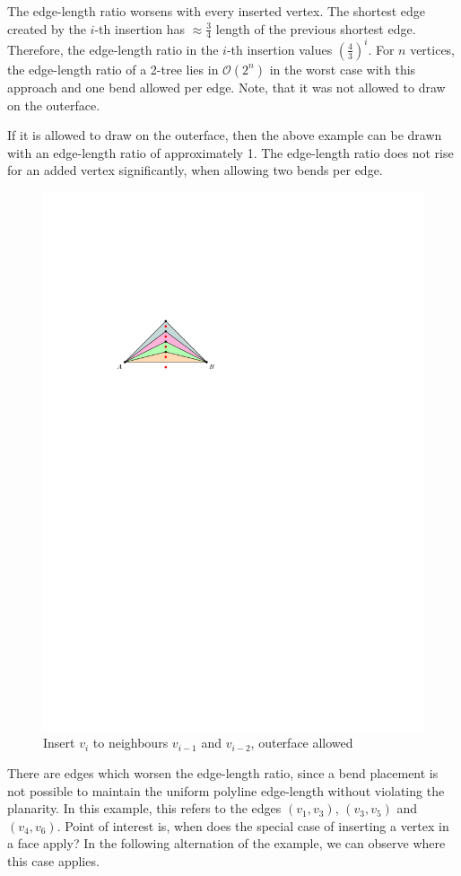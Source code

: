 The edge-length ratio worsens with every inserted vertex. The shortest edge created by the $i$-th insertion has $\approx \frac{3}{4}$ length of the previous shortest edge. Therefore, the edge-length ratio in the $i$-th insertion values $\left(\frac{4}{3}\right)^i$. For $n$ vertices, the edge-length ratio of a 2-tree lies in $\mathcal{O}(2^n)$ in the worst case with this approach and one bend allowed per edge. Note, that it was not allowed to draw on the outerface.
\begin{observation}
	If it is allowed to draw on the outerface, then the above example can be drawn with an edge-length ratio of approximately 1. The edge-length ratio does not rise for an added vertex significantly, when allowing two bends per edge.
\end{observation}
\begin{figure}[H]

		\centering
		\includegraphics[width=.4\linewidth,page=14]{drawings/k-trees.pdf}
		\caption{Insert $v_i$ to neighbours $v_{i-1}$ and $v_{i-2}$, outerface allowed}

\end{figure}
There are edges which worsen the edge-length ratio, since a bend placement is not possible to maintain the uniform polyline edge-length without violating the planarity. In this example, this refers to the edges $(v_1,v_3)$, $(v_3,v_5)$ and $(v_4,v_6)$. Point of interest is, when does the special case of inserting a vertex in a face apply? In the following alternation of the example, we can observe where this case applies.
